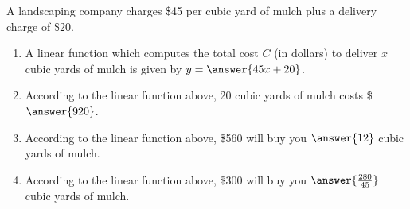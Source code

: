 \documentclass{ximera}
\author{Kenneth Berglund}
\begin{document}
\begin{exercise}
\licenseSZ

A landscaping company charges \$45 per cubic yard of mulch plus a delivery charge of \$20.


\begin{enumerate}
\item A linear function which computes the total cost $C$ (in dollars) to deliver $x$ cubic yards of mulch is given by $y = \answer{45x + 20}$.

\item According to the linear function above, 20 cubic yards of mulch costs \$$\answer{920}$.

\item According to the linear function above, \$560 will buy you $\answer{12}$ cubic yards of mulch. 

\item According to the linear function above, \$300 will buy you $\answer{\frac{280}{45}}$ cubic yards of mulch. 
	
\end{enumerate}

\end{exercise}
\end{document}
